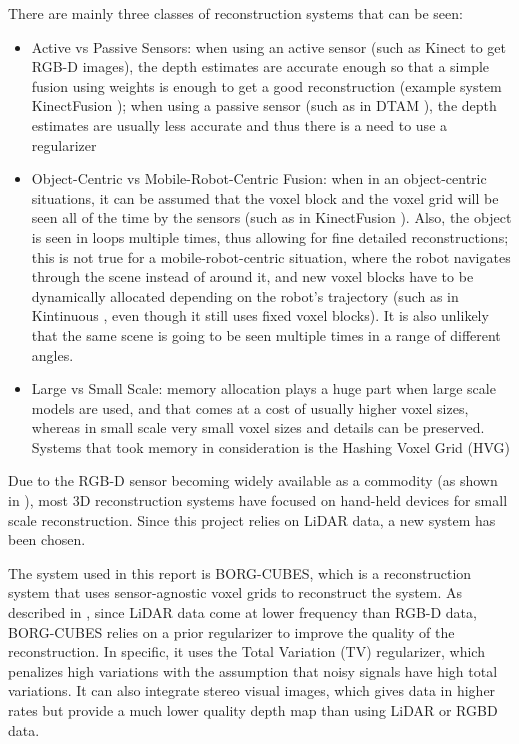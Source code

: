 \documentclass[12pt]{article}
\begin{document}
There are mainly three classes of reconstruction systems that can be seen:
	
\begin{itemize}
\item Active vs Passive Sensors: when using an active sensor (such as Kinect to get RGB-D images), the depth estimates are accurate enough so that a simple fusion using weights is enough to get a good reconstruction (example system KinectFusion \cite{kinectfusion}); when using a passive sensor (such as in DTAM \cite{DTAM}), the depth estimates are usually less accurate and thus there is a need to use a regularizer
\item Object-Centric vs Mobile-Robot-Centric Fusion: when in an object-centric situations, it can be assumed that the voxel block and the voxel grid will be seen all of the time by the sensors (such as in KinectFusion \cite{kinectfusion}). Also, the object is seen in loops multiple times, thus allowing for fine detailed reconstructions; this is not true for a mobile-robot-centric situation, where the robot navigates through the scene instead of around it, and new voxel blocks have to be dynamically allocated depending on the robot's trajectory (such as in Kintinuous \cite{kintinuous}, even though it still uses fixed voxel blocks). It is also unlikely that the same scene is going to be seen multiple times in a range of different angles.
\item Large vs Small Scale: memory allocation plays a huge part when large scale models are used, and that comes at a cost of usually higher voxel sizes, whereas in small scale very small voxel sizes and details can be preserved. Systems that took memory in consideration is the Hashing Voxel Grid (HVG) \cite{HVG}
\end{itemize}
	
Due to the RGB-D sensor becoming widely available as a commodity (as shown in \cite{kinectfusion}), most 3D reconstruction systems have focused on hand-held devices for small scale reconstruction. Since this project relies on LiDAR data, a new system has been chosen.	
	
The system used in this report is BORG-CUBES, which is a reconstruction system that uses sensor-agnostic voxel grids to reconstruct the system. As described in \cite{TannerArXiv2016}, since LiDAR data come at lower frequency than RGB-D data, BORG-CUBES relies on a prior regularizer to improve the quality of the reconstruction. In specific, it uses the Total Variation (TV) regularizer, which penalizes high variations with the assumption that noisy signals have high total variations. It can also integrate stereo visual images, which gives data in higher rates but provide a much lower quality depth map than using LiDAR or RGBD data.	
\end{document}
